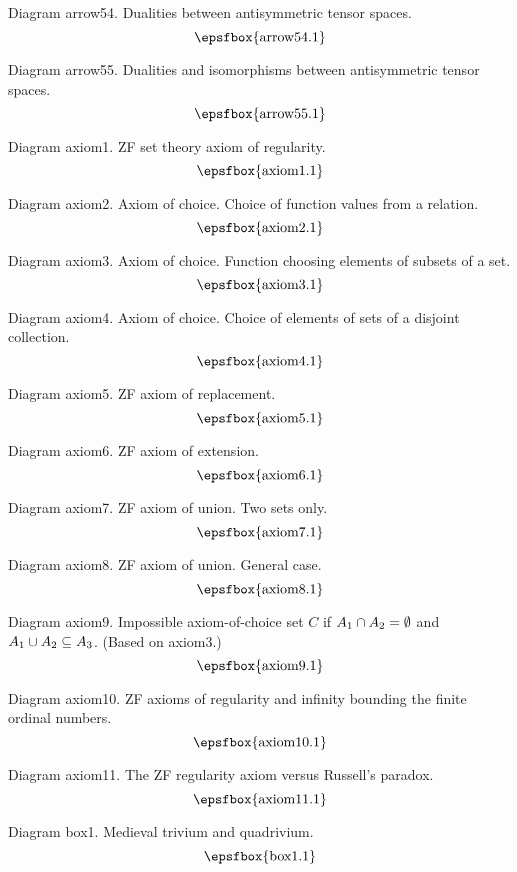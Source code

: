 Diagram arrow54. Dualities between antisymmetric tensor spaces.
$$
\centerline{\epsfbox{arrow54.1}}
$$

Diagram arrow55. Dualities and isomorphisms between antisymmetric tensor spaces.
$$
\centerline{\epsfbox{arrow55.1}}
$$


\secteject
\edef\SECTaxiom{\the\pageno}

Diagram axiom1. ZF set theory axiom of regularity.
$$
\centerline{\epsfbox{axiom1.1}}
$$

Diagram axiom2. Axiom of choice. Choice of function values from a relation.
$$
\centerline{\epsfbox{axiom2.1}}
$$

Diagram axiom3. Axiom of choice. Function choosing elements of subsets of a set.
$$
\centerline{\epsfbox{axiom3.1}}
$$

Diagram axiom4. Axiom of choice. Choice of elements of sets of a disjoint
collection.
$$
\centerline{\epsfbox{axiom4.1}}
$$

Diagram axiom5. ZF axiom of replacement.
$$
\centerline{\epsfbox{axiom5.1}}
$$

Diagram axiom6. ZF axiom of extension.
$$
\centerline{\epsfbox{axiom6.1}}
$$

\filleject

Diagram axiom7. ZF axiom of union. Two sets only.
$$
\centerline{\epsfbox{axiom7.1}}
$$

Diagram axiom8. ZF axiom of union. General case.
$$
\centerline{\epsfbox{axiom8.1}}
$$

Diagram axiom9. Impossible axiom-of-choice set $C$ if $A_1\mathbin{\cap} A_2=\emptyset$
and~$A_1\mathbin{\cup} A_2\subseteq A_3$. (Based on axiom3.)
$$
\centerline{\epsfbox{axiom9.1}}
$$

Diagram axiom10. ZF axioms of regularity and infinity bounding the finite
ordinal numbers.
$$
\centerline{\epsfbox{axiom10.1}}
$$

Diagram axiom11. The ZF regularity axiom versus Russell's paradox.
$$
\centerline{\epsfbox{axiom11.1}}
$$

\secteject
\edef\SECTbox{\the\pageno}

Diagram box1. Medieval trivium and quadrivium.
$$
\centerline{\epsfbox{box1.1}}
$$

